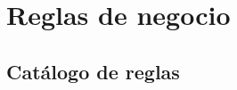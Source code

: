 %
%

\section{Reglas de negocio}
\label{sec:reglas-negocio}

\subsection{Catálogo de reglas}
\label{sec:catalogo-reglas}

